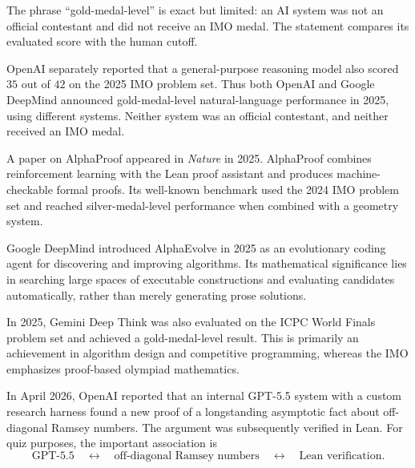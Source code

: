     \begin{remark}
        The phrase ``gold-medal-level'' is exact but limited: an AI system was not
        an official contestant and did not receive an IMO medal. The statement
        compares its evaluated score with the human cutoff.
    \end{remark}

    \begin{fact}
        OpenAI separately reported that a general-purpose reasoning model also
        scored $35$ out of $42$ on the 2025 IMO problem set. Thus both OpenAI and
        Google DeepMind announced gold-medal-level natural-language performance
        in 2025, using different systems. Neither system was an official
        contestant, and neither received an IMO medal.
    \end{fact}

    \begin{fact}
        A paper on AlphaProof appeared in \textit{Nature} in 2025. AlphaProof
        combines reinforcement learning with the Lean proof assistant and
        produces machine-checkable formal proofs. Its well-known benchmark used
        the 2024 IMO problem set and reached silver-medal-level performance when
        combined with a geometry system.
    \end{fact}

    \begin{fact}[AlphaEvolve]
        Google DeepMind introduced AlphaEvolve in 2025 as an evolutionary coding
        agent for discovering and improving algorithms. Its mathematical
        significance lies in searching large spaces of executable constructions
        and evaluating candidates automatically, rather than merely generating
        prose solutions.
    \end{fact}

    \begin{fact}
        In 2025, Gemini Deep Think was also evaluated on the ICPC World Finals
        problem set and achieved a gold-medal-level result. This is primarily an
        achievement in algorithm design and competitive programming, whereas the
        IMO emphasizes proof-based olympiad mathematics.
    \end{fact}

    \begin{fact}
        In April 2026, OpenAI reported that an internal GPT-5.5 system with a
        custom research harness found a new proof of a longstanding asymptotic
        fact about off-diagonal Ramsey numbers. The argument was subsequently
        verified in Lean. For quiz purposes, the important association is
        \[
            \text{GPT-5.5}
            \quad\longleftrightarrow\quad
            \text{off-diagonal Ramsey numbers}
            \quad\longleftrightarrow\quad
            \text{Lean verification}.
        \]
    \end{fact}

